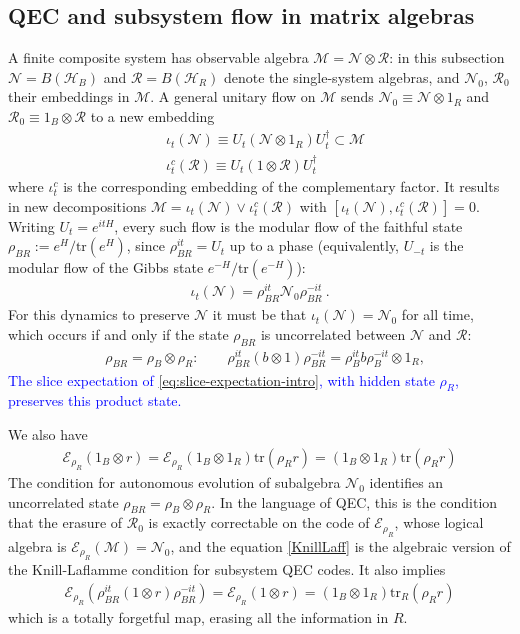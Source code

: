 \documentclass[a4paper,11pt]{article}
\theoremstyle{definition}
\newcommand{\mR}{\mathcal{R}}
\newcommand{\nn}{\nonumber}
\newcommand{\mN}{\mathcal{N}}
\newcommand{\mM}{\mathcal{M}}
\newcommand{\NL}[1]{\textcolor{blue}{#1}}
\newcommand{\tr}{\text{tr}}
\newcommand{\mE}{\mathcal{E}}
\begin{document}
\subsection{QEC and subsystem flow in matrix algebras}
A finite composite system has observable algebra $\mM=\mN\otimes\mR$: in this subsection $\mN=B(\mathcal H_B)$ and $\mR=B(\mathcal H_R)$ denote the single-system algebras, and $\mN_0$, $\mR_0$ their embeddings in $\mM$. A general unitary flow on $\mM$ sends $\mN_0\equiv \mN\otimes 1_R$ and $\mR_0\equiv 1_B\otimes \mR$ to a new embedding
\begin{align}
&\iota_t(\mN)\equiv U_t(\mN\otimes 1_R)U_t^\dagger\subset\mM  \nn\\
&\iota_t^c(\mR)\equiv U_t(1\otimes \mR)U_t^\dagger
\end{align}
where $\iota_t^c$ is the corresponding embedding of the complementary factor. It results in new decompositions $\mM=\iota_t(\mN)\vee\iota_t^c(\mR)$ with $[\iota_t(\mN),\iota_t^c(\mR)]=0$.
Writing $U_t=e^{itH}$, every such flow is the modular flow of the faithful state $\rho_{BR}:=e^{H}/\tr(e^{H})$, since $\rho_{BR}^{it}=U_t$ up to a phase (equivalently, $U_{-t}$ is the modular flow of the Gibbs state $e^{-H}/\tr(e^{-H})$):
\begin{align}
    \iota_t(\mN)=\rho_{BR}^{it}\mN_0\rho_{BR}^{-it}\ .
\end{align}
For this dynamics to preserve $\mN$ it must be that $\iota_t(\mN)=\mN_0$ for all time, which occurs if and only if the state $\rho_{BR}$ is uncorrelated between $\mN$ and $\mR$:
\begin{align}
 &   \rho_{BR}=\rho_B\otimes \rho_R:\qquad     \rho_{BR}^{it}(b\otimes 1)\rho_{BR}^{-it}=\rho_B^{it}b\rho_B^{-it}\otimes 1_R,
\end{align}
\NL{The slice expectation of \eqref{eq:slice-expectation-intro}, with hidden state $\rho_R$, preserves this product state.}

We also have
\begin{align}\label{KnillLaff}
    \mE_{\rho_R}(1_B\otimes r)=\mE_{\rho_R}(1_B\otimes 1_R)\tr(\rho_R r)=(1_B\otimes 1_R)\tr(\rho_R r)
\end{align}
The condition for autonomous evolution of subalgebra $\mN_0$ identifies an uncorrelated state $\rho_{BR}=\rho_B\otimes \rho_R$. In the language of QEC, this is the condition that the erasure of $\mR_0$ is exactly correctable on the code of $\mE_{\rho_R}$, whose logical algebra is $\mE_{\rho_R}(\mM)=\mN_0$, and the equation \eqref{KnillLaff} is the algebraic version of the Knill-Laflamme condition for subsystem QEC codes. It also implies
\begin{align}
    \mE_{\rho_R}(\rho_{BR}^{it}(1\otimes r)\rho_{BR}^{-it})=\mE_{\rho_R}(1\otimes r)=(1_B\otimes 1_R)\tr_R(\rho_R r)
\end{align}
which is a totally forgetful map, erasing all the information in $R$.
\end{document}

